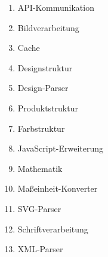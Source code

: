 \begin{enumerate}
    \item{API-Kommunikation}
    \item{Bildverarbeitung}
    \item{Cache}
    \item{Designstruktur}
    \item{Design-Parser}
    \item{Produktstruktur}
    \item{Farbstruktur}
    \item{JavaScript-Erweiterung}
    \item{Mathematik}
    \item{Maßeinheit-Konverter}
    \item{SVG-Parser}
    \item{Schriftverarbeitung}
    \item{XML-Parser}
\end{enumerate}